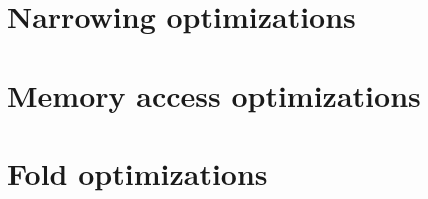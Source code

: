 \section{Narrowing optimizations}
\label{Sec:narrowing}

\section{Memory access optimizations}
\label{Sec:mao}

\section{Fold optimizations}
\label{Sec:fold}

